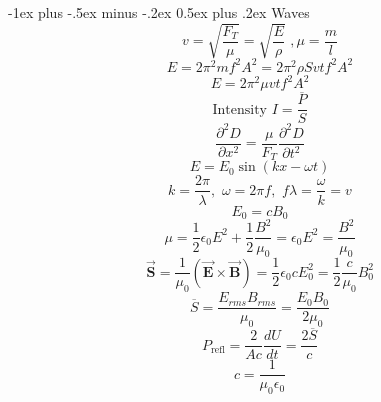 \documentclass[12pt,landscape]{article}
\makeatletter
\renewcommand{\section}{\@startsection{section}{1}{0mm}%
                                {-1ex plus -.5ex minus -.2ex}%
                                {0.5ex plus .2ex}%
                                {\normalfont\large\bfseries}}
\makeatother
\begin{document}
\begin{multicols}{4}
    \section{Waves}
    \begin{equation*}
        v = \sqrt{\frac{F_T}{\mu}} = \sqrt{\frac{E}{\rho}}\,\,, \mu = \frac{m}{l}
    \end{equation*}
    \begin{equation*}
        E = 2\pi^2 m f^2 A^2 = 2\pi^2 \rho S v t f^2 A^2
    \end{equation*}
    \begin{equation*}
        E = 2 \pi^2 \mu v t f^2 A^2
    \end{equation*}
    \begin{equation*}
        \text{Intensity } I = \frac{\overbar{P}}{S}
    \end{equation*}
    \begin{equation*}
        \frac{\partial^2 D}{\partial x^2} = \frac{\mu}{F_T} \frac{\partial^2 D}{\partial t^2}
    \end{equation*}
    \begin{equation*}
        E = E_0 \sin (kx - \omega t)
    \end{equation*}
    \begin{equation*}
        k = \frac{2\pi}{\lambda}, \,\, \omega = 2\pi f,\,\, f \lambda = \frac{\omega}{k} = v
    \end{equation*}
    \begin{equation*}
        E_0 = c B_0
    \end{equation*}
    \begin{equation*}
        \mu = \frac{1}{2}\epsilon_0 E^2 + \frac{1}{2} \frac{B^2}{\mu_0} = \epsilon_0 E^2 = \frac{B^2}{\mu_0}
    \end{equation*}
    \begin{equation*}
        \vec{\mathbf{S}} = \frac{1}{\mu_0} (\vec{\mathbf{E}} \times \vec{\mathbf{B}}) = \frac{1}{2} \epsilon_0 c E_0^2 = \frac{1}{2} \frac{c}{\mu_0} B_0^2
    \end{equation*}
    \begin{equation*}
        \overbar{S} = \frac{E_{rms}B_{rms}}{\mu_0} = \frac{E_0 B_0}{2 \mu_0}
    \end{equation*}
    \begin{equation*}
        P_{\text{refl}} = \frac{2}{Ac} \frac{dU}{dt} = \frac{2 \overbar{S}}{c}
    \end{equation*}
    \begin{equation*}
        c = \frac{1}{\mu_0 \epsilon_0}
    \end{equation*}


\end{multicols}
\end{document}
